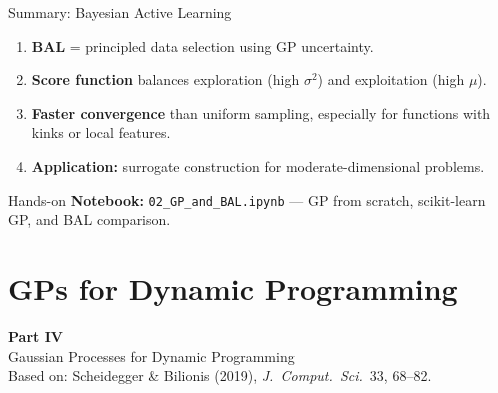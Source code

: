 \documentclass[aspectratio=169,11pt]{beamer}
\begin{document}
\begin{frame}{Summary: Bayesian Active Learning}
\begin{enumerate}
  \item \textbf{BAL} = principled data selection using GP uncertainty.
  \item \textbf{Score function} balances exploration (high $\sigma^2$) and exploitation (high $\mu$).
  \item \textbf{Faster convergence} than uniform sampling, especially for functions with kinks or local features.
  \item \textbf{Application:} surrogate construction for moderate-dimensional problems.
\end{enumerate}

\vspace{0.3cm}
\begin{block}{Hands-on}
\textbf{Notebook:} \texttt{02\_GP\_and\_BAL.ipynb} --- GP from scratch, scikit-learn GP, and BAL comparison.
\end{block}
\end{frame}

\section{GPs for Dynamic Programming}

\begin{frame}{}
\vfill
\begin{center}
{\Huge \textcolor{uzhblue}{\textbf{Part IV}}}\\[12pt]
{\LARGE Gaussian Processes for Dynamic Programming}\\[8pt]
{\small Based on: Scheidegger \& Bilionis (2019), \emph{J.\ Comput.\ Sci.}\ 33, 68--82.}
\end{center}
\vfill
\end{frame}
\end{document}
